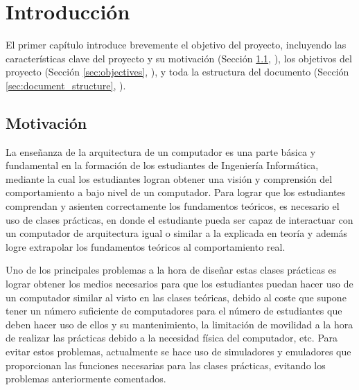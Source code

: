 \chead[]{}
\renewcommand{\headrulewidth}{0.5pt}

\lfoot[]{}
\cfoot[]{}
\rfoot[]{}
\renewcommand{\footrulewidth}{0pt}

\chapter{Introducción}
\label{ch:introduction}

El primer capítulo introduce brevemente el objetivo del proyecto, incluyendo las características clave del proyecto y su motivación (Sección \ref{sec:background_and_motivation}, \textit{}), los objetivos del proyecto (Sección \ref{sec:objectives}, \textit{}), y toda la estructura del documento (Sección \ref{sec:document_structure}, \textit{}).

\section{Motivación}
\label{sec:background_and_motivation}

La enseñanza de la arquitectura de un computador es una parte básica y fundamental en la formación de los estudiantes de Ingeniería Informática, mediante la cual los estudiantes logran obtener una visión y comprensión del comportamiento a bajo nivel de un computador. Para lograr que los estudiantes comprendan y asienten correctamente los fundamentos teóricos, es necesario el uso de clases prácticas, en donde el estudiante pueda ser capaz de interactuar con un computador de arquitectura igual o similar a la explicada en teoría y además logre extrapolar los fundamentos teóricos al comportamiento real.

Uno de los principales problemas a la hora de diseñar estas clases prácticas es lograr obtener los medios necesarios para que los estudiantes puedan hacer uso de un computador similar al visto en las clases teóricas, debido al coste que supone tener un número suficiente de computadores para el número de estudiantes que deben hacer uso de ellos y su mantenimiento, la limitación de movilidad a la hora de realizar las prácticas debido a la necesidad física del computador, etc. Para evitar estos problemas, actualmente se hace uso de simuladores y emuladores que proporcionan las funciones necesarias para las clases prácticas, evitando los problemas anteriormente comentados.

